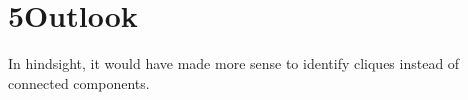 \chapter{5\quad Outlook}

In hindsight, it would have made more sense to identify cliques instead of connected components.